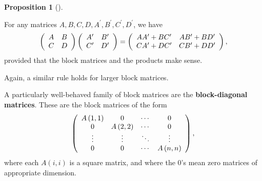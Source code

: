 \documentclass[numbers=enddot,12pt,final,onecolumn,notitlepage]{scrartcl}%
\numberwithin{exer}{subsection}
\theoremstyle{definition}
\newtheorem{prop}[theo]{Proposition}
\newenvironment{proposition}[1][]
{\begin{prop}[#1]\begin{leftbar}}
{\end{leftbar}\end{prop}}
\begin{document}
\begin{proposition}
For any matrices $A,B,C,D,A^{\prime},B^{\prime},C^{\prime},D^{\prime}$, we
have%
\[
\left(
\begin{array}
[c]{cc}%
A & B\\
C & D
\end{array}
\right)  \left(
\begin{array}
[c]{cc}%
A^{\prime} & B^{\prime}\\
C^{\prime} & D^{\prime}%
\end{array}
\right)  =\left(
\begin{array}
[c]{cc}%
AA^{\prime}+BC^{\prime} & AB^{\prime}+BD^{\prime}\\
CA^{\prime}+DC^{\prime} & CB^{\prime}+DD^{\prime}%
\end{array}
\right)  ,
\]
provided that the block matrices and the products make sense.
\end{proposition}

Again, a similar rule holds for larger block matrices.

A particularly well-behaved family of block matrices are the
\textbf{block-diagonal matrices}. These are the block matrices of the form%
\[
\left(
\begin{array}
[c]{cccc}%
A\left(  1,1\right)   & 0 & \cdots & 0\\
0 & A\left(  2,2\right)   & \cdots & 0\\
\vdots & \vdots & \ddots & \vdots\\
0 & 0 & \cdots & A\left(  n,n\right)
\end{array}
\right)  ,
\]
where each $A\left(  i,i\right)  $ is a square matrix, and where the $0$'s
mean zero matrices of appropriate dimension.
\end{document}
